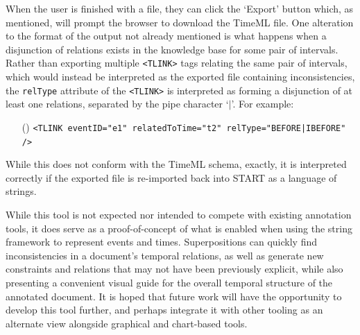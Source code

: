 \documentclass[a4paper,12pt,leqno]{article}
\newcommand{\ipp}{(\refstepcounter{equation}\theequation)}
\begin{document}
When the user is finished with a file, they can click the `Export' button which, as mentioned, will prompt the browser to download the TimeML file. One alteration to the format of the output not already mentioned is what happens when a disjunction of relations exists in the knowledge base for some pair of intervals. Rather than exporting multiple \verb|<TLINK>| tags relating the same pair of intervals, which would instead be interpreted as the exported file containing inconsistencies, the \verb|relType| attribute of the \verb|<TLINK>| is interpreted as forming a disjunction of at least one relations, separated by the pipe character `$|$'. For example:
\begin{itemize}
	\item[\ipp] \verb!<TLINK eventID="e1" relatedToTime="t2" relType="BEFORE|IBEFORE" />!
\end{itemize}
While this does not conform with the TimeML schema, exactly, it is interpreted correctly if the exported file is re-imported back into START as a language of strings.

While this tool is not expected nor intended to compete with existing annotation tools, it does serve as a proof-of-concept of what is enabled when using the string framework to represent events and times. Superpositions can quickly find inconsistencies in a document's temporal relations, as well as generate new constraints and relations that may not have been previously explicit, while also presenting a convenient visual guide for the overall temporal structure of the annotated document. It is hoped that future work will have the opportunity to develop this tool further, and perhaps integrate it with other tooling as an alternate view alongside graphical and chart-based tools.

\end{document}
